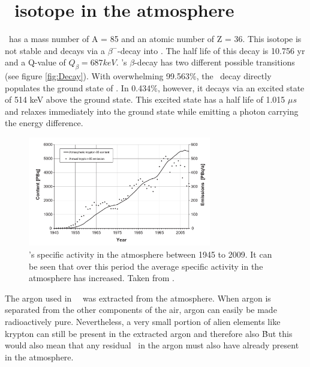 \documentclass[encoding=utf8,british]{tumphthesis}
\begin{document}



\section{\Kr\ isotope in the atmosphere}
\label{sec:Kry85}

\Kr\ has a mass number of A = 85 and an atomic number of Z = 36.
This isotope is not stable and decays via a $\beta^-$-decay into .
The half life of this decay is 10.756 yr \cite{singh_nuclear_2014} and a Q-value of $Q_\beta = 687 \unit{keV}$.
\Kr's $\beta$-decay has two different possible transitions (see figure \ref{fig:Decay}).
With overwhelming 99.563$\%$, the \Kr\ decay directly populates the ground state of .
In 0.434$\%$, however, it decays via an excited state of  514 keV above the ground state.
This excited state has a half life of 1.015 $\unit{\mu s}$ and relaxes immediately into the ground state while emitting  a photon carrying the energy difference.
\\

\begin{figure}[t!]
	\centering
	\ifmakefigures%
	\includegraphics[width=80mm]{./Bilder/Kr85Aenderung.png}
	\fi%
	\caption{
	    \Kr's specific activity in the atmosphere between 1945 to 2009. It can be seen that over this period the average specific activity in the atmosphere has increased. 
		Taken from \cite{ahlswede_update_2013}.
	}
    \label{fig:Kr85Aenderung}
    
\end{figure}

The argon used in \gerda\ \PII\ was extracted from the atmosphere.
When argon is separated from the other components of the air, argon can easily be made radioactively pure.
Nevertheless, a very small portion of alien elements like krypton can still be present in the extracted argon and therefore also \Kr\.  
But this would also mean that any residual \Kr\ in the argon must also have already present in the atmosphere.
\\
\end{document}
